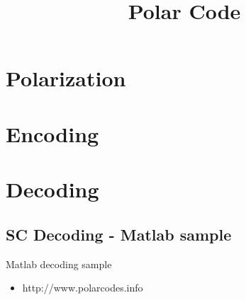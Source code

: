 \documentclass{beamer}
\title{Polar Code}
\begin{document}
\begin{frame}
\titlepage
\end{frame}

\begin{frame}
	\tableofcontents
\end{frame}


\section{Polarization}
\begin{frame}

\end{frame}

\section{Encoding}


\section{Decoding}

\subsection{SC Decoding - Matlab sample}

\begin{frame}{Matlab decoding sample}
  \begin{itemize}
      \item http://www.polarcodes.info
  \end{itemize}
\end{frame}
\end{document}
